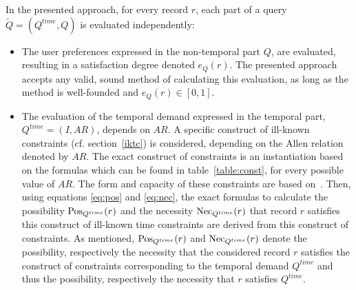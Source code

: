 In the presented approach, for every record $r$, each part of a query $\tilde{Q} = \left( Q^{time}, Q \right)$ is evaluated independently:
\begin{itemize}
\item
The user preferences expressed in the non-temporal part $Q$, are evaluated, resulting in a satisfaction degree denoted $e_Q(r)$. The presented approach accepts any valid, sound method of calculating this evaluation, as long as the method is well-founded and $e_Q(r) \in \left[0,1\right]$.
\item
The evaluation of the temporal demand expressed in the temporal part, $Q^{time} = \left( I,AR \right)$, depends on $AR$. A specific construct of ill-known constraints (cf. section~\ref{iktc}) is considered, depending on the Allen relation denoted by $AR$. The exact construct of constraints is an instantiation based on the formulas which can be found in table~\ref{table:const}, for every possible value of $AR$. The form and capacity of these constraints are based on~\cite{Pon11}. Then, using equations \eqref{eq:pos} and \eqref{eq:nec}, the exact formulas to calculate the possibility $\operatorname{Pos}_{Q^{time}}(r)$ and the necessity $\operatorname{Nec}_{Q^{time}}(r)$ that record $r$ satisfies this construct of ill-known time constraints are derived from this construct of constraints. As mentioned, $\operatorname{Pos}_{Q^{time}}(r)$ and $\operatorname{Nec}_{Q^{time}}(r)$ denote the possibility, respectively the necessity that the considered record $r$ satisfies the construct of constraints corresponding to the temporal demand $Q^{time}$ and thus the possibility, respectively the necessity that $r$ satisfies $Q^{time}$.


\end{itemize}


